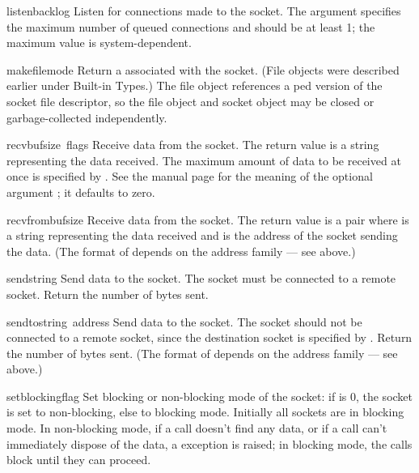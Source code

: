\begin{funcdesc}{listen}{backlog}
Listen for connections made to the socket.
The argument specifies the maximum number of queued connections and
should be at least 1; the maximum value is system-dependent.
\end{funcdesc}

\begin{funcdesc}{makefile}{mode}
Return a  associated with the socket.
(File objects were described earlier under Built-in Types.)
The file object references a ped version of the socket file
descriptor, so the file object and socket object may be closed or
garbage-collected independently.
\end{funcdesc}

\begin{funcdesc}{recv}{bufsize\, flags}
Receive data from the socket.  The return value is a string representing
the data received.  The maximum amount of data to be received
at once is specified by .  See the \UNIX{} manual page
for the meaning of the optional argument ; it defaults to
zero.
\end{funcdesc}

\begin{funcdesc}{recvfrom}{bufsize}
Receive data from the socket.  The return value is a pair
 where  is a string
representing the data received and  is the address of the
socket sending the data.
(The format of  depends on the address family --- see above.)
\end{funcdesc}

\begin{funcdesc}{send}{string}
Send data to the socket.  The socket must be connected to a remote
socket.  Return the number of bytes sent.
\end{funcdesc}

\begin{funcdesc}{sendto}{string\, address}
Send data to the socket.  The socket should not be connected to a
remote socket, since the destination socket is specified by
.  Return the number of bytes sent.
(The format of  depends on the address family --- see above.)
\end{funcdesc}

\begin{funcdesc}{setblocking}{flag}
Set blocking or non-blocking mode of the socket: if  is 0,
the socket is set to non-blocking, else to blocking mode.  Initially
all sockets are in blocking mode.  In non-blocking mode, if a
 call doesn't find any data, or if a  call can't
immediately dispose of the data, a  exception is
raised; in blocking mode, the calls block until they can proceed.
\end{funcdesc}

